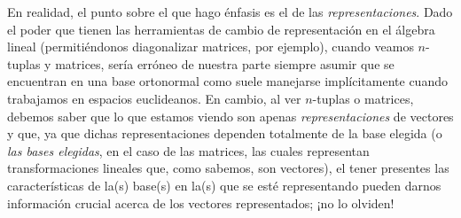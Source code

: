 \documentclass[notasLineal]{subfiles}
\begin{document}
\begin{tcolorbox}
\vspace{3mm}
\hspace{2.5mm} En realidad, el punto sobre el que hago énfasis es el de las \emph{representaciones}. Dado el poder que tienen las herramientas de cambio de representación en el álgebra lineal (permitiéndonos diagonalizar matrices, por ejemplo), cuando veamos $n$-tuplas y matrices, sería erróneo de nuestra parte siempre asumir que se encuentran en una base ortonormal \textemdash como suele manejarse implícitamente cuando trabajamos en espacios euclideanos. En cambio, al ver $n$-tuplas o matrices, debemos saber que lo que estamos viendo son apenas \emph{representaciones} de vectores y que, ya que dichas representaciones dependen totalmente de la base elegida (o \emph{las bases elegidas}, en el caso de las matrices, las cuales representan transformaciones lineales que, como sabemos, son vectores), el tener presentes las características de la(s) base(s) en la(s) que se esté representando pueden darnos información crucial acerca de los vectores representados; ¡no lo olviden!
\end{tcolorbox}
\end{document}
